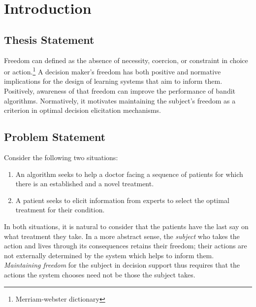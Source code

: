 \chapter{Introduction}
\label{cha:intro}


\section{Thesis Statement}
\label{sec:thesisstatement}

Freedom can defined as the absence of necessity, coercion, or constraint in choice or action.\footnote{Merriam-webster dictionary}
A decision maker's freedom has both positive and normative implications for the design of learning systems that aim to inform them. 
Positively, awareness of that freedom can improve the performance of bandit algorithms. 
Normatively, it motivates maintaining the subject's freedom as a criterion in optimal decision elicitation mechanisms.

\section{Problem Statement}
\label{sec:problemstatement}

Consider the following two situations:

\begin{enumerate}
\item An algorithm seeks to help a doctor facing a sequence of patients for which there is an established and a novel treatment. 
\item A patient seeks to elicit information from experts to select the optimal treatment for their condition.
\end{enumerate}

In both situations, it is natural to consider that the patients have the last say on what treatment they take.
In a more abstract sense, the \emph{subject} who takes the action and lives through its consequences retains their freedom; their actions are not externally determined by the system which helps to inform them.
\emph{Maintaining freedom} for the subject in decision support thus requires that the actions the system chooses need not be those the subject takes.

